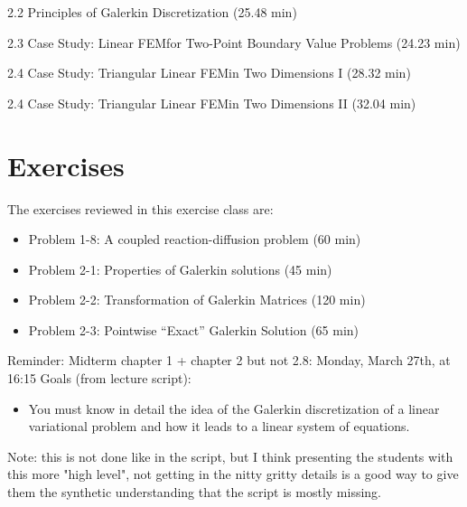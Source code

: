 




\begin{Theory}
\item 2.2 Principles of Galerkin Discretization (25.48 min)
\item 2.3 Case Study: Linear FEMfor Two-Point Boundary Value Problems (24.23 min)
\item 2.4 Case Study: Triangular Linear FEMin Two Dimensions I (28.32 min)
\item 2.4 Case Study: Triangular Linear FEMin Two Dimensions II (32.04 min)
\end{Theory}

\section*{Exercises}
The exercises reviewed in this exercise class are:
\begin{itemize}
    \item Problem 1-8: A coupled reaction-diffusion problem (60 min)
    \item Problem 2-1: Properties of Galerkin solutions (45 min)
    \item Problem 2-2: Transformation of Galerkin Matrices (120 min)
    \item Problem 2-3: Pointwise “Exact” Galerkin Solution (65 min)
\end{itemize}



\tableofcontents

\newpage



Reminder: Midterm chapter 1 + chapter 2 but not 2.8: Monday, March 27th, at 16:15
Goals (from lecture script):
\begin{itemize}
    \item You must know in detail the idea of the Galerkin discretization of a linear variational problem and
how it leads to a linear system of equations.
\end{itemize}



 Note: this is not done like in the script, but I think presenting the students with this more "high level", not getting in the nitty gritty details is a good way to give them the synthetic understanding that the script is mostly missing.

